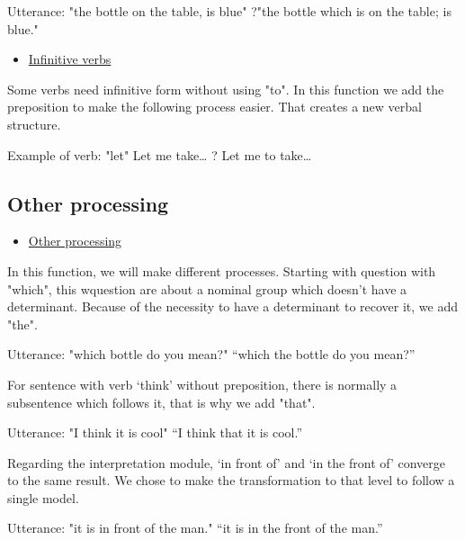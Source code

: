 \documentclass[twoside,a4paper,10pt]{report}
\begin{document}
\small
\begin{verbatimtab}
  Utterance: "the bottle on the table, is blue" 
  ?"the bottle which is on the table; is blue."
\end{verbatimtab}
\normalsize

\begin{itemize}
    \item  \underline{Infinitive verbs}
\end{itemize}
Some verbs need infinitive form without using "to". In this function we add the preposition to make the following process easier. That creates a new verbal structure.


\small
\begin{verbatimtab}
 Example of verb: "let"
 Let me take… ? Let me to take… 
\end{verbatimtab}
\normalsize

\subsection{Other processing}
\label{b5a7a96e3b75d0ff95064af9e93e7927}%

\begin{itemize}
    \item  \underline{Other processing}
\end{itemize}
In this function, we will make different processes. Starting with question with "which", this w{\textunderscore}question are about a nominal group which doesn’t have a determinant. Because of the necessity to have a determinant to recover it, we add "the".


\small
\begin{verbatimtab}
  Utterance: "which bottle do you mean?"
  “which the bottle do you mean?”
\end{verbatimtab}
\normalsize
For sentence with verb ‘think’ without preposition, there is normally a subsentence which follows it, that is why we add "that".


\small
\begin{verbatimtab}
  Utterance: "I think it is cool"
  “I think that it is cool.”
\end{verbatimtab}
\normalsize
Regarding the interpretation module, ‘in front of’ and ‘in the front of’ converge to the same result. We chose to make the transformation to that level to follow a single model.


\small
\begin{verbatimtab}
  Utterance: "it is in front of the man."
  “it is in the front of the man.”
\end{verbatimtab}
\normalsize
\end{document}
